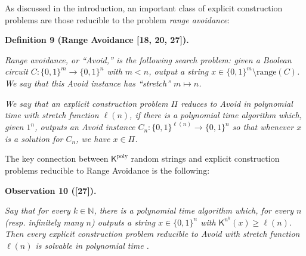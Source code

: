 \documentclass[10pt,a4paper]{article}
\begin{document}



As discussed in the introduction, an important class of explicit construction problems are those reducible to the problem \emph{range avoidance}:\par





\par\medskip\noindent\textbf{
\textbf{Definition 9}\textbf{ }(Range Avoidance [18, 20, 27])\textbf{.}
}\par



\emph{Range avoidance, or “Avoid,” is the following search problem: given a Boolean circuit $C:\{0,1\}^{m}\to\{0,1\}^{n}$ with $m<n$, output a string $x\in\{0,1\}^{m}\setminus\mathrm{range}(C)$. We say that this Avoid instance has “stretch” $m\mapsto n$.}\par




\emph{We say that an explicit construction problem $\Pi$ reduces to Avoid in polynomial time with stretch function $\ell(n)$, if there is a polynomial time algorithm which, given $1^{n}$, outputs an Avoid instance $C_{n}:\{0,1\}^{\ell(n)}\to\{0,1\}^{n}$ so that whenever $x$ is a solution for $C_{n}$, we have $x\in\Pi$.}\par






The key connection between ${\mathsf{K}}^{\mathrm{poly}}$ random strings and explicit construction problems reducible to Range Avoidance is the following:\par





\par\medskip\noindent\textbf{
\textbf{Observation 10}\textbf{ }([27])\textbf{.}
}\par



\emph{Say that for every $k\in\mathbb{N}$, there is a polynomial time algorithm which, for every $n$ (resp. infinitely many $n$) outputs a string $x\in\{0,1\}^{n}$ with ${\mathsf{K}}^{n^{k}}(x)\geq\ell(n)$. Then every explicit construction problem reducible to Avoid with stretch function $\ell(n)$ is solvable in polynomial time .}\par
\end{document}
